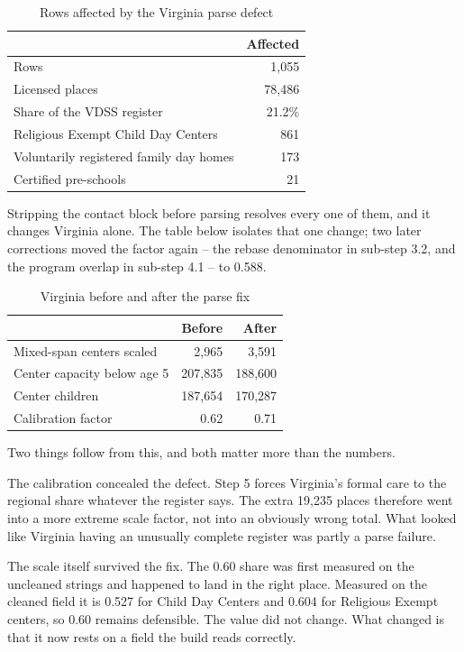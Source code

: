 \documentclass[11pt]{article}
\begin{document}
\begin{table}[H]
\centering
\caption{Rows affected by the Virginia parse defect}
\begin{tabular}{L{7.0cm}r}
\toprule
& \textbf{Affected} \\
\midrule
Rows                                       & 1,055 \\
Licensed places                            & 78,486 \\
Share of the VDSS register                 & 21.2\% \\
Religious Exempt Child Day Centers         & 861 \\
Voluntarily registered family day homes    & 173 \\
Certified pre-schools                      & 21 \\
\bottomrule
\end{tabular}
\end{table}

Stripping the contact block before parsing resolves every one of them, and it
changes Virginia alone. The table below isolates that one change; two later
corrections moved the factor again -- the rebase denominator in sub-step 3.2,
and the program overlap in sub-step 4.1 -- to 0.588.

\begin{table}[H]
\centering
\caption{Virginia before and after the parse fix}
\begin{tabular}{L{6.0cm}rr}
\toprule
& \textbf{Before} & \textbf{After} \\
\midrule
Mixed-span centers scaled   &   2,965 &   3,591 \\
Center capacity below age 5 & 207,835 & 188,600 \\
Center children             & 187,654 & 170,287 \\
Calibration factor          &    0.62 &    0.71 \\
\bottomrule
\end{tabular}
\end{table}

Two things follow from this, and both matter more than the numbers.

The calibration concealed the defect. Step 5 forces Virginia's
formal care to the regional share whatever the register says. The extra 19,235
places therefore went into a more extreme scale factor, not into an obviously
wrong total. What looked like Virginia having an unusually complete
register was partly a parse failure.

The scale itself survived the fix. The 0.60 share was first measured on the
uncleaned strings and happened to land in the right place. Measured on the
cleaned field it is 0.527 for Child Day Centers and 0.604 for Religious Exempt
centers, so 0.60 remains defensible. The value did not change. What changed is
that it now rests on a field the build reads correctly.
\end{document}
